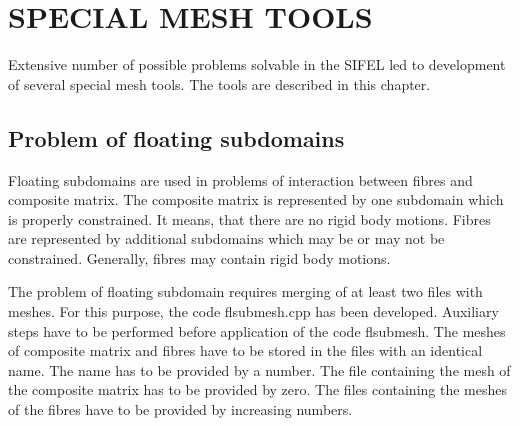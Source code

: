 \documentclass[12pt]{book}
\begin{document}
\chapter{SPECIAL MESH TOOLS}

Extensive number of possible problems solvable in the SIFEL led to development of several
special mesh tools. The tools are described in this chapter.


\section{Problem of floating subdomains}

Floating subdomains are used in problems of interaction between fibres and composite
matrix. The composite matrix is represented by one subdomain which is properly constrained.
It means, that there are no rigid body motions. Fibres are represented by additional
subdomains which may be or may not be constrained. Generally, fibres may contain
rigid body motions.

The problem of floating subdomain requires merging of at least two files with meshes.
For this purpose, the code flsubmesh.cpp has been developed. Auxiliary steps have to be
performed before application of the code flsubmesh. The meshes of composite matrix
and fibres have to be stored in the files with an identical name. The name has to be
provided by a number. The file containing the mesh of the composite matrix has to be
provided by zero. The files containing the meshes of the fibres have to be provided
by increasing numbers. 
\end{document}
